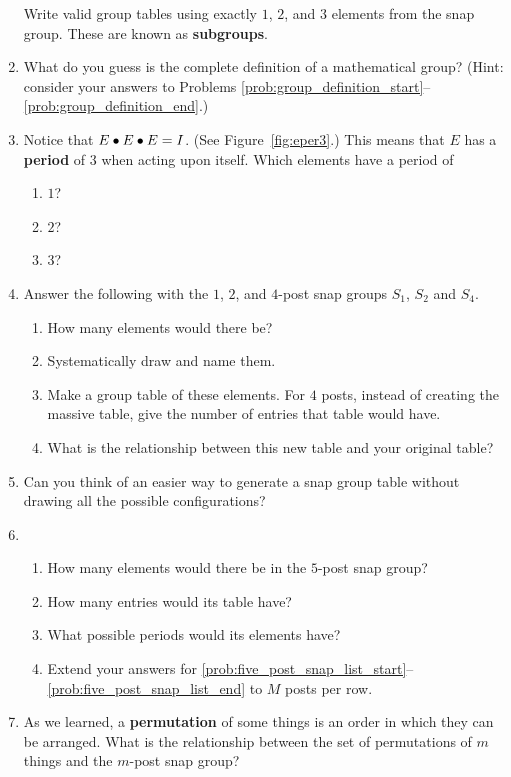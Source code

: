 \documentclass[../gatm.tex]{subfiles}
\begin{document}
\begin{enumerate}
	Write valid group tables using exactly $1$, $2$, and $3$ elements from the snap group. These are known as \textbf{subgroups}.\label{prob:group_definition_end}
	\item What do you guess is the complete definition of a mathematical group?
		(Hint: consider your answers to Problems \ref{prob:group_definition_start}--\ref{prob:group_definition_end}.)
	\item Notice that $E\bullet E\bullet E=I$. (See Figure~\ref{fig:eper3}.)
	This means that $E$ has a \textbf{period} of $3$ when acting upon itself.
	Which elements have a period of
	\begin{multicols}{3}
		\begin{enumerate}
			\item $1$?
			\item $2$?
			\item $3$?
		\end{enumerate}
	\end{multicols}
	\item Answer the following with the $1$, $2$, and $4$-post snap groups $S_1$, $S_2$ and $S_4$.\begin{enumerate}
		      \item How many elements would there be?
		      \item Systematically draw and name them.
		      \item Make a group table of these elements.
		      For $4$ posts, instead of creating the massive table, give the number of entries that table would have.
		      \item What is the relationship between this new table and your original table?
	      \end{enumerate}
	\item Can you think of an easier way to generate a snap group table without drawing all the possible configurations?
	\item \begin{enumerate}
		      \item How many elements would there be in the $5$-post snap group? \label{prob:five_post_snap_list_start}
		      \item How many entries would its table have?
		      \item What possible periods would its elements have? \label{prob:five_post_snap_list_end}
		      \item Extend your answers for \ref{prob:five_post_snap_list_start}--\ref{prob:five_post_snap_list_end} to $M$ posts per row.
	      \end{enumerate}
	\item As we learned, a \textbf{permutation} of some things is an order in which they can be arranged.
	What is the relationship between the set of permutations of $m$ things and the $m$-post snap group?
\end{enumerate}
\end{document}
